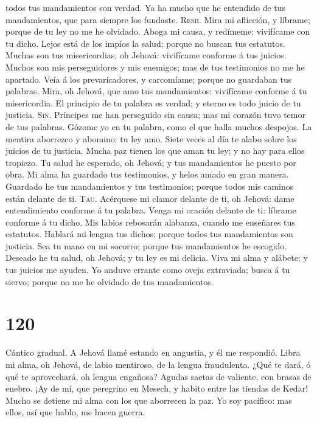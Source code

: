 todos tus mandamientos son verdad.  Ya ha mucho que he
entendido de tus mandamientos, que para siempre los fundaste.
 \textsc{Resh}. Mira mi aflicción, y líbrame; porque de
tu ley no me he olvidado.  Aboga mi causa, y redímeme:
vivifícame con tu dicho.  Lejos está de los impíos la
salud; porque no buscan tus estatutos.  Muchas son tus
misericordias, oh Jehová: vivifícame conforme á tus juicios.
 Muchos son mis perseguidores y mis enemigos; mas de tus
testimonios no me he apartado.  Veía á los
prevaricadores, y carcomíame; porque no guardaban tus palabras.
 Mira, oh Jehová, que amo tus mandamientos: vivifícame
conforme á tu misericordia.  El principio de tu palabra
es verdad; y eterno es todo juicio de tu justicia. 
\textsc{Sin}. Príncipes me han perseguido sin causa; mas mi corazón tuvo
temor de tus palabras.  Gózome yo en tu palabra, como el
que halla muchos despojos.  La mentira aborrezco y
abomino: tu ley amo.  Siete veces al día te alabo sobre
los juicios de tu justicia.  Mucha paz tienen los que
aman tu ley; y no hay para ellos tropiezo.  Tu salud he
esperado, oh Jehová; y tus mandamientos he puesto por obra.
 Mi alma ha guardado tus testimonios, y helos amado en
gran manera.  Guardado he tus mandamientos y tus
testimonios; porque todos mis caminos están delante de ti.
 \textsc{Tau}. Acérquese mi clamor delante de ti, oh
Jehová: dame entendimiento conforme á tu palabra.  Venga
mi oración delante de ti: líbrame conforme á tu dicho. 
Mis labios rebosarán alabanza, cuando me enseñares tus estatutos.
 Hablará mi lengua tus dichos; porque todos tus
mandamientos son justicia.  Sea tu mano en mi socorro;
porque tus mandamientos he escogido.  Deseado he tu
salud, oh Jehová; y tu ley es mi delicia.  Viva mi alma
y alábete; y tus juicios me ayuden.  Yo anduve errante
como oveja extraviada; busca á tu siervo; porque no me he olvidado de
tus mandamientos.

\hypertarget{section-119}{%
\section{120}\label{section-119}}

 Cántico gradual. A Jehová llamé estando en angustia, y él
me respondió.  Libra mi alma, oh Jehová, de labio
mentiroso, de la lengua fraudulenta.  ¿Qué te dará, ó qué
te aprovechará, oh lengua engañosa?  Agudas saetas de
valiente, con brasas de enebro.  ¡Ay de mí, que peregrino
en Mesech, y habito entre las tiendas de Kedar!  Mucho se
detiene mi alma con los que aborrecen la paz.  Yo soy
pacífico: mas ellos, así que hablo, me hacen guerra.


